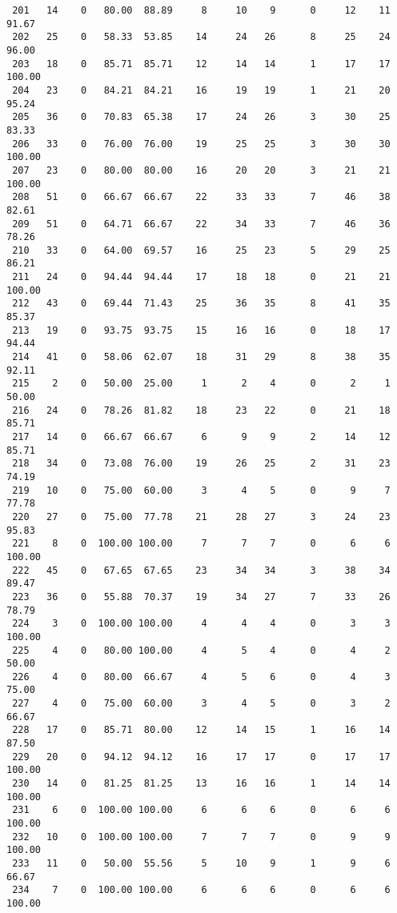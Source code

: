 \begin{verbatim}
 201   14    0   80.00  88.89     8     10    9      0     12    11    91.67
 202   25    0   58.33  53.85    14     24   26      8     25    24    96.00
 203   18    0   85.71  85.71    12     14   14      1     17    17   100.00
 204   23    0   84.21  84.21    16     19   19      1     21    20    95.24
 205   36    0   70.83  65.38    17     24   26      3     30    25    83.33
 206   33    0   76.00  76.00    19     25   25      3     30    30   100.00
 207   23    0   80.00  80.00    16     20   20      3     21    21   100.00
 208   51    0   66.67  66.67    22     33   33      7     46    38    82.61
 209   51    0   64.71  66.67    22     34   33      7     46    36    78.26
 210   33    0   64.00  69.57    16     25   23      5     29    25    86.21
 211   24    0   94.44  94.44    17     18   18      0     21    21   100.00
 212   43    0   69.44  71.43    25     36   35      8     41    35    85.37
 213   19    0   93.75  93.75    15     16   16      0     18    17    94.44
 214   41    0   58.06  62.07    18     31   29      8     38    35    92.11
 215    2    0   50.00  25.00     1      2    4      0      2     1    50.00
 216   24    0   78.26  81.82    18     23   22      0     21    18    85.71
 217   14    0   66.67  66.67     6      9    9      2     14    12    85.71
 218   34    0   73.08  76.00    19     26   25      2     31    23    74.19
 219   10    0   75.00  60.00     3      4    5      0      9     7    77.78
 220   27    0   75.00  77.78    21     28   27      3     24    23    95.83
 221    8    0  100.00 100.00     7      7    7      0      6     6   100.00
 222   45    0   67.65  67.65    23     34   34      3     38    34    89.47
 223   36    0   55.88  70.37    19     34   27      7     33    26    78.79
 224    3    0  100.00 100.00     4      4    4      0      3     3   100.00
 225    4    0   80.00 100.00     4      5    4      0      4     2    50.00
 226    4    0   80.00  66.67     4      5    6      0      4     3    75.00
 227    4    0   75.00  60.00     3      4    5      0      3     2    66.67
 228   17    0   85.71  80.00    12     14   15      1     16    14    87.50
 229   20    0   94.12  94.12    16     17   17      0     17    17   100.00
 230   14    0   81.25  81.25    13     16   16      1     14    14   100.00
 231    6    0  100.00 100.00     6      6    6      0      6     6   100.00
 232   10    0  100.00 100.00     7      7    7      0      9     9   100.00
 233   11    0   50.00  55.56     5     10    9      1      9     6    66.67
 234    7    0  100.00 100.00     6      6    6      0      6     6   100.00

\end{verbatim}

